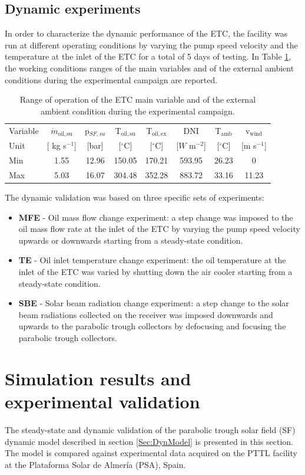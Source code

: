 \documentclass[final,3p,times,review]{elsarticle}
\begin{document}
\subsection{Dynamic experiments}
%
In order to characterize the dynamic performance of the ETC, the facility was run at different operating conditions by varying the pump speed velocity and the temperature at the inlet of the ETC for a total of 5 days of testing. In Table \ref{Tab:SF_workCond}, the working conditions ranges of the main variables and of the external ambient conditions during the experimental campaign are reported. 
%
\begin{table}[h!]
\centering
\caption{Range of operation of the ETC main variable and of the external ambient condition during the experimental campaign.}
\begin{tabular}{lccccccc}
\toprule
 Variable & $\dot{m}_\mathrm{oil,su}$ & p$_{SF,su}$  &T$_\mathrm{oil,su}$  & T$_\mathrm{oil,ex}$ &  DNI &  T$_\mathrm{amb}$ & v$_\mathrm{wind}$ \\
Unit &  [ kg s$^{-1}$] & [bar] & [$^{\circ}$C] &  [$^{\circ}$C]&  [$W$ m$^{-2}$] &  [$^{\circ}$C] &  [m s$^{-1}$] \\
\toprule
Min & 1.55      &   12.96 & 150.05  &   170.21  &   593.95  &   26.23 &   0  \\
Max & 5.03      &   16.07 & 304.48  &   352.28  &   883.72  &   33.16 &   11.23  \\
\bottomrule
\end{tabular}
\label{Tab:SF_workCond}
\end{table}
%
The dynamic validation was based on three specific sets of experiments:
%
\begin{itemize}
\item \textbf{MFE} - Oil mass flow change experiment: a step change was imposed to the oil mass flow rate at the inlet of the ETC by varying the pump speed velocity upwards or downwards starting from a steady-state condition.
\item \textbf{TE} - Oil inlet temperature change experiment: the oil temperature at the inlet of the ETC was varied by shutting down the air cooler starting from a steady-state condition. 
\item \textbf{SBE} - Solar beam radiation change experiment: a step change to the solar beam radiations  collected on the receiver was imposed downwards and upwards to the parabolic trough collectors by defocusing and focusing the parabolic trough collectors.
\end{itemize} 
%
\section{Simulation results and experimental validation}
%
The steady-state and dynamic validation of the parabolic trough solar field (SF) dynamic model described in section \ref{Sec:DynModel} is presented in this section. The model is compared against experimental data acquired on the PTTL facility at the Plataforma Solar de Almer\' ia (PSA), Spain. 
%
\end{document}
